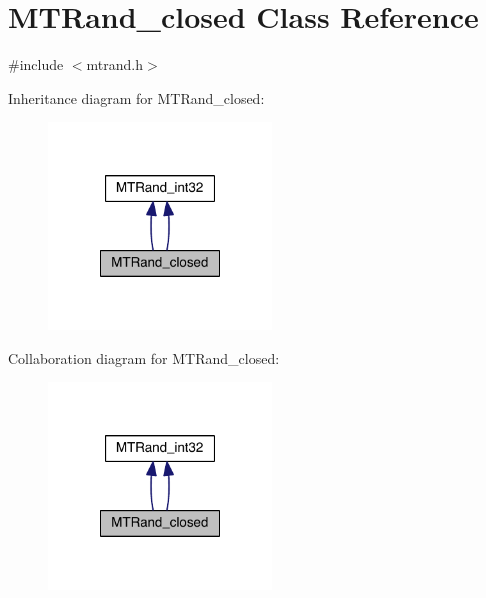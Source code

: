 \hypertarget{a00017}{\section{M\+T\+Rand\+\_\+closed Class Reference}
\label{a00017}
}


{\ttfamily \#include $<$mtrand.\+h$>$}



Inheritance diagram for M\+T\+Rand\+\_\+closed\+:\nopagebreak
\begin{figure}[H]
\begin{center}
\leavevmode
\includegraphics[width=168pt]{a00221}
\end{center}
\end{figure}


Collaboration diagram for M\+T\+Rand\+\_\+closed\+:\nopagebreak
\begin{figure}[H]
\begin{center}
\leavevmode
\includegraphics[width=168pt]{a00222}
\end{center}
\end{figure}
